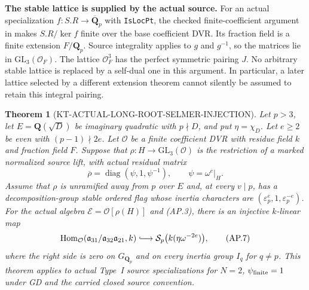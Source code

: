 \documentclass[11pt,a4paper]{article}
\newtheorem{theorem}{Theorem}[section]
\theoremstyle{definition}
\renewcommand{\paragraph}[1]{\par\smallskip\noindent\textbf{#1}\quad\ignorespaces}
\begin{document}
\paragraph{The stable lattice is supplied by the actual source.}
For an actual specialization $f:S.R\to\overline{\mathbf Q}_p$
with \texttt{IsLocPt}, the checked finite-coefficient argument
in  makes $S.R/\ker f$ finite
over the base coefficient DVR.  Its fraction field is a
finite extension $F/\mathbf Q_p$.  Source integrality applies
to $g$ and $g^{-1}$, so the matrices lie in
$\mathrm{GL}_3(\mathcal O_F)$.  The lattice
$\mathcal O_F^3$ has the perfect symmetric pairing $J$.
No arbitrary stable lattice is replaced by a self-dual one
in this argument.  In particular, a later lattice selected
by a different extension theorem cannot silently be assumed
to retain this integral pairing.

\begin{theorem}[KT-ACTUAL-LONG-ROOT-SELMER-INJECTION]
Let $p>3$, let $E=\mathbf Q(\sqrt D)$ be imaginary quadratic
with $p\nmid D$, and put $\eta=\chi_D$.
Let $e\ge2$ be even with $(p-1)\nmid2e$.
Let $\mathcal O$ be a finite coefficient DVR with residue
field $k$ and fraction field $F$.  Suppose that
$\rho:H\to\mathrm{GL}_3(\mathcal O)$ is the restriction of
a marked normalized source lift, with actual residual matrix
\[
 \overline\rho=\operatorname{diag}(\psi,1,\psi^{-1}),
 \qquad\psi=\omega^e|_H.                                   \tag{AP.6}
\]
Assume that $\rho$ is unramified away from $p$ over $E$ and,
at every $v\mid p$, has a decomposition-group stable ordered
flag whose inertia characters are
$(\varepsilon_p^e,1,\varepsilon_p^{-e})$.
For the actual algebra
$\mathcal E=\mathcal O[\rho(H)]$ and (AP.3), there is an
injective $k$-linear map
\[
 \operatorname{Hom}_{\mathcal O}
   (\mathfrak a_{31}/\mathfrak a_{32}\mathfrak a_{21},k)
 \lhook\joinrel\longrightarrow
 \mathcal S_p\bigl(k(\eta\omega^{-2e})\bigr),               \tag{AP.7}
\]
where the right side is zero on $G_{\mathbf Q_p}$ and on
every inertia group $I_q$ for $q\ne p$.
This theorem applies to actual Type~I source specializations
for $N=2$, $\psi_{\rm finite}=1$ under GD and the carried
closed source convention.
\end{theorem}
\end{document}
